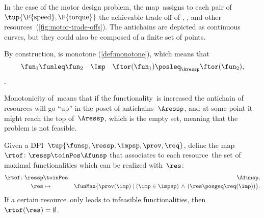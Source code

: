 \begin{example}
  In the case of the motor design problem, the map~\ftor assigns
  to each pair of~$\tup{\F{\text{speed}},\F{\text{torque}}}$
  the achievable trade-off of , , and other resources~(\cref{fig:motor-trade-offs}).
  The antichains are depicted as continuous curves, but they could also
  be composed of a finite set of points.

\end{example}


By construction, \ftor is monotone (\cref{def:monotone}), which means that
\begin{equation*}
  \fun_{1}\funleq\fun_{2}\quad\Imp\quad\ftor(\fun_{1})\posleq_{\Aressp}\ftor(\fun_{2}),
\end{equation*}.


Monotonicity of~\ftor means that if the functionality~\fun is increased the antichain of resources will go ``up'' in the poset of antichains~$\Aressp$,
and at some point it might reach the top of~$\Aressp$, which is the empty set, meaning that the problem is not feasible.


\begin{definition}
  \label{def:rtof}
  Given a DPI~$\tup{ \funsp,\ressp,\impsp,\prov,\req}$,
  define the map~$\rtof\colon \ressp\toinPos \Afunsp$ that associates
  to each resource~\res the set of maximal functionalities which can be realized with~$\res$:
  \begin{eqnarray*}
    \rtof\colon \ressp & \toinPos & \Afunsp,\\
    \res& \mapsto & \funMax\{\prov(\imp)\mid\left(\imp\in\impsp\right)\,\wedge\,\left(\res\posgeq\req(\imp)\right)\}.
  \end{eqnarray*}
  If a certain resource~\res only leads to infeasible functionalities, then~$\rtof(\res)=\emptyset$.
\end{definition}


